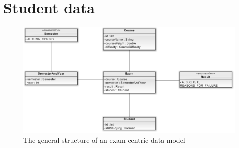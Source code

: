 \section{Student data}

	\begin{figure}[H]%
		\includegraphics[width=\columnwidth]{UML/examCentricDataModel.png}%
		\caption{The general structure of an exam centric data model}%
		\label{fig:examCentricDataModel}%
	\end{figure}